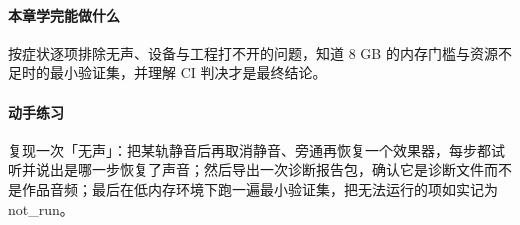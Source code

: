 \paragraph{本章学完能做什么} 按症状逐项排除无声、设备与工程打不开的问题，知道 8 GB 的内存门槛与资源不足时的最小验证集，并理解 CI 判决才是最终结论。

\paragraph{动手练习} 复现一次「无声」：把某轨静音后再取消静音、旁通再恢复一个效果器，每步都试听并说出是哪一步恢复了声音；然后导出一次诊断报告包，确认它是诊断文件而不是作品音频；最后在低内存环境下跑一遍最小验证集，把无法运行的项如实记为 not\_run。
